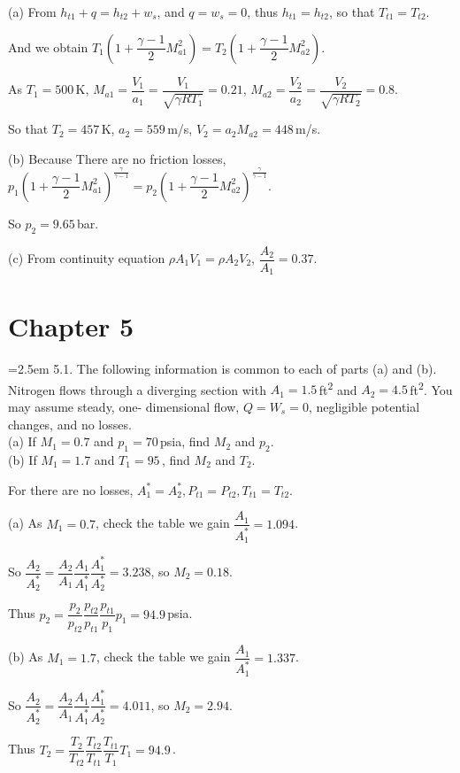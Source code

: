 \documentclass[12pt]{article}
\newlength{\questionlabelwidth}
\newcommand{\question}[2]{%
  \par\noindent
  {\hangindent=2.5em %
   \hangafter=1 %
   \makebox[\questionlabelwidth][l]{\textbf{#1}}#2\par}%
}
\begin{document}
\begin{answerbox}
(a) From $h_{t1}+q=h_{t2}+w_s$, and $q=w_s=0$, thus $h_{t1}=h_{t2}$, so that $T_{t1}=T_{t2}$.

And we obtain $T_1\left(1+\dfrac{\gamma -1}{2}M_{a1}^2\right)=T_2\left(1+\dfrac{\gamma -1}{2}M_{a2}^2\right)$.

As $T_1=500$\,\si{K}, $M_{a1}=\dfrac{V_1}{a_1}=\dfrac{V_1}{\sqrt{\gamma RT_1}}=0.21$, $M_{a2}=\dfrac{V_2}{a_2}=\dfrac{V_2}{\sqrt{\gamma RT_2}}=0.8$.

So that $T_2=457$\,\si{K}, $a_2=559$\,\si{m/s}, $V_2=a_2M_{a2}=448$\,\si{m/s}.

(b) Because There are no friction losses,  $p_1\left(1+\dfrac{\gamma -1}{2}M_{a1}^2\right)^{\frac{\gamma}{\gamma -1}}=p_2\left(1+\dfrac{\gamma -1}{2}M_{a2}^2\right)^{\frac{\gamma}{\gamma -1}}$.

So $p_2=9.65$\,\si{bar}.

(c) From continuity equation $\rho A_1 V_1=\rho A_2 V_2$, $\dfrac{A_2}{A_1}=0.37$.
\end{answerbox}

\newpage

\section{Chapter 5}
\question{5.1}{5.1.	The following information is common to each of parts (a) and (b). Nitrogen flows through a diverging section with $A_1 = 1.5$\,\si{ft^2} and $A_2 = 4.5$\,\si{ft^2}. You may assume steady, one- dimensional flow, $Q=W_s=0$, negligible potential changes, and no losses.\\
(a)	If $M_1 = 0.7$ and $p_1 = 70$\,\si{psia}, find $M_2$ and $p_2$.\\
(b)	If $M_1 = 1.7$ and $T_1 = 95$\,\si{\Fahrenheit}, find $M_2$ and $T_2$.
}

\begin{answerbox}
For there are no losses, $A_1^{*}=A_2^{*}, P_{t1}=P_{t2}, T_{t1}=T_{t2}$.

(a) As $M_1=0.7$, check the table we gain $\dfrac{A_1}{A_1^{*}}=1.094$.

So $\dfrac{A_2}{A_2^{*}}=\dfrac{A_2}{A_1}\dfrac{A_1}{A_1^{*}}\dfrac{A_1^{*}}{A_2^{*}}=3.238$, so $M_2=0.18$.

Thus $p_2=\dfrac{p_2}{p_{t2}}\dfrac{p_{t2}}{p_{t1}}\dfrac{p_{t1}}{p_1}p_1=94.9$\,\si{psia}.

(b) As $M_1=1.7$, check the table we gain $\dfrac{A_1}{A_1^{*}}=1.337$.

So $\dfrac{A_2}{A_2^{*}}=\dfrac{A_2}{A_1}\dfrac{A_1}{A_1^{*}}\dfrac{A_1^{*}}{A_2^{*}}=4.011$, so $M_2=2.94$.

Thus $T_2=\dfrac{T_2}{T_{t2}}\dfrac{T_{t2}}{T_{t1}}\dfrac{T_{t1}}{T_1}T_1=94.9$\,\si{\Fahrenheit}.
\end{answerbox}
\end{document}
